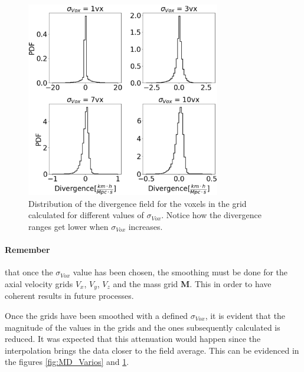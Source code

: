 \documentclass[usenatbib]{mnras}
\begin{document}
\begin{figure}
    \centering
    \includegraphics[width=240pt]{smooth_grad_dist.pdf}
    \caption{Distribution of the divergence field for the voxels in the grid calculated for different values of $\sigma_{Vox}$. Notice how the divergence ranges get lower when $\sigma_{Vox}$ increases.}
    \label{fig:VCD_Varios}
\end{figure}


\paragraph{Remember}  that once the $\sigma_{Vox}$ value has been chosen, the smoothing must be done for the axial velocity grids $V_x$, $V_y$, $V_z$ and the mass grid \textbf{M}. This in order to have coherent results in future processes.




Once the grids have been smoothed with a defined $\sigma_{Vox}$, it is evident that the magnitude of the values in the grids and the ones subsequently calculated is reduced. It was expected that this attenuation would happen since the interpolation brings the data closer to the field average. This can be evidenced in the figures \ref{fig:MD_Varios} and \ref{fig:VCD_Varios}.
\end{document}

